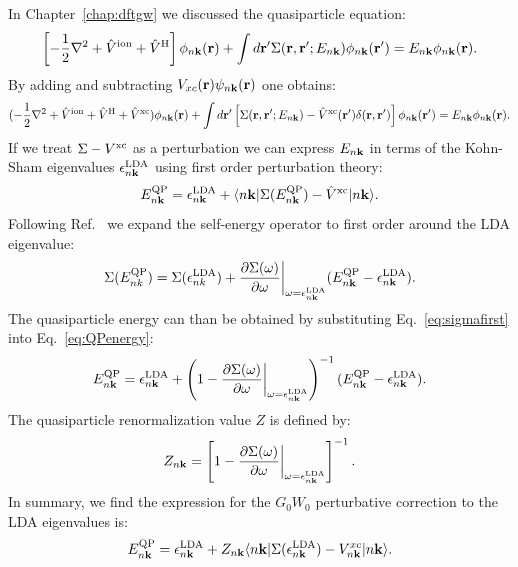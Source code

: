 In Chapter~\ref{chap:dftgw} we discussed the quasiparticle equation:
%
\begin{equation}
\label{eq:qpeq2}
\left[-\frac{1}{2}\nabla^{2} + \hat{V}^{\rm{ion}} + \hat{V}^{\rm{H}}\right]\phi_{n{\bf k}}({\bf r}) + \int{d}{\bf r}' \Sigma({\bf r},{\bf r}';E_{n{\bf k}})\phi_{n{\bf k}}({\bf r}')=E_{n{\bf k}}\phi_{n{\bf k}}({\bf r}).
\end{equation}
%
By adding and subtracting $V_{xc}({\bf r})\psi_{n{\bf k}}({\bf r})$ one obtains:
%
\begin{equation}
(-\frac{1}{2}\nabla^{2} + \hat{V}^{\rm{ion}} + \hat{V}^{\rm{H}} + \hat{V}^{\rm{xc}})\phi_{n{\bf k}}({\bf r}) + \int{d}{\bf r}' \left[\Sigma({\bf r},{\bf r}';E_{n{\bf k}})-\hat{V}^{\rm{xc}}({\bf r}')\delta({\bf r},{\bf r}')\right]\phi_{n{\bf k}}({\bf r}') = E_{n{\bf k}}\phi_{n{\bf k}}({\bf r}).
\end{equation}
%
If we treat $\Sigma-V^{\rm{xc}}$ as a perturbation we can express $E_{n{\bf k}}$
in terms of the Kohn-Sham eigenvalues $\epsilon^{\rm{LDA}}_{n{\bf k}}$ using 
first order perturbation theory:
%
\begin{equation}
\label{eq:QPenergy}
E_{n{\bf k}}^{\rm{QP}} = \epsilon_{n{\bf k}}^{\rm{LDA}} + \langle n{\bf k}| \Sigma(E_{n{\bf k}}^{\rm{QP}}) - \hat{V}^{\rm{xc}}|n{\bf k}\rangle.
\end{equation}
%
Following Ref.~\cite{HL86} we expand the self-energy operator to first order around the LDA eigenvalue:
%
\begin{equation}
\label{eq:sigmafirst}
\Sigma( E_{nk}^{\rm{QP}} ) = \Sigma(\epsilon_{nk}^{\rm{LDA}}) + \frac{\partial\Sigma(\omega)}{\partial \omega}\bigg|_{\omega = \epsilon_{n{\bf k}}^{\rm{LDA}}}(E_{n{\bf k}}^{\rm{QP}} - \epsilon_{n{\bf k}}^{\rm{LDA}}). 
\end{equation}
%
The quasiparticle energy can than be obtained by substituting Eq.~\ref{eq:sigmafirst} into Eq.~\ref{eq:QPenergy}:
%
\begin{equation}
\label{eq:QPfirst}
E_{n{\bf k}}^{\rm{QP}} = \epsilon_{n{\bf k}}^{\rm{LDA}} + \left(1-\frac{\partial\Sigma(\omega)}{\partial \omega}\bigg|_{\omega=\epsilon_{n{\bf k}}^{\rm{LDA}}}\right)^{-1}(E_{n{\bf k}}^{\rm{QP}} - \epsilon_{n{\bf k}}^{\rm{LDA}}). 
\end{equation}
%
The quasiparticle renormalization value $Z$ is defined by:
%
\begin{equation}
Z_{n{\bf k}} =  \left[1-\frac{\partial\Sigma(\omega)}{\partial \omega}\bigg|_{\omega = \epsilon_{n{\bf k}}^{\rm{LDA}}}\right]^{-1}.
\end{equation}
%
In summary, we find the expression for the $G_{0}W_{0}$ perturbative correction to the LDA eigenvalues is:
%
\begin{equation}
\label{eq:qpcorrpert}
E^{\rm{QP}}_{n{\bf k}} =  \epsilon^{\rm{LDA}}_{n{\bf k}} + Z_{n{\bf k}}\langle n{\bf k}|\Sigma(\epsilon^{\rm{LDA}}_{n{\bf k}})-V^{xc}_{n{\bf k}}| n{\bf k}\rangle.
\end{equation}
%

